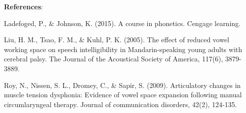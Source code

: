 \documentclass{../labbook}
\begin{document}
\bigskip
\textbf{References}:

\noindent Ladefoged, P., \& Johnson, K. (2015). A course in phonetics. Cengage learning.

Liu, H. M., Tsao, F. M., \& Kuhl, P. K. (2005). The effect of reduced vowel working space on speech intelligibility in Mandarin-speaking young adults with cerebral palsy. The Journal of the Acoustical Society of America, 117(6), 3879-3889.

Roy, N., Nissen, S. L., Dromey, C., \& Sapir, S. (2009). Articulatory changes in muscle tension dysphonia: Evidence of vowel space expansion following manual circumlaryngeal therapy. Journal of communication disorders, 42(2), 124-135.
\end{document}
